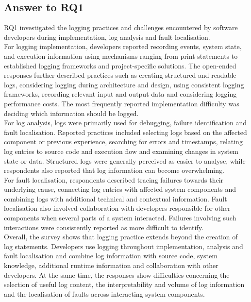\subsection{Answer to RQ1}

RQ1 investigated the logging practices and challenges encountered by software
developers during implementation, log analysis and fault localisation.
\\
For logging implementation, developers reported recording events, system state, and
execution information using mechanisms ranging from print statements to established
logging frameworks and project-specific solutions. The open-ended responses further
described practices such as creating structured and readable logs, considering
logging during architecture and design, using consistent logging frameworks,
recording relevant input and output data and considering logging performance costs.
The most frequently reported implementation difficulty was deciding which information
should be logged.
\\
For log analysis, logs were primarily used for debugging, failure identification and
fault localisation. Reported practices included selecting logs based on the affected
component or previous experience, searching for errors and timestamps, relating log
entries to source code and execution flow and examining changes in system state or
data. Structured logs were generally perceived as easier to analyse, while respondents
also reported that log information can become overwhelming.
\\
For fault localisation, respondents described tracing failures towards their
underlying cause, connecting log entries with affected system components and combining
logs with additional technical and contextual information. Fault localisation also
involved collaboration with developers responsible for other components when several
parts of a system interacted. Failures involving such interactions were consistently
reported as more difficult to identify.
\\
Overall, the survey shows that logging practice extends beyond the creation of log
statements. Developers use logging throughout implementation, analysis and fault
localisation and combine log information with source code, system knowledge,
additional runtime information and collaboration with other developers. At the same
time, the responses show difficulties concerning the selection of useful log content,
the interpretability and volume of log information and the localisation of faults
across interacting system components.

